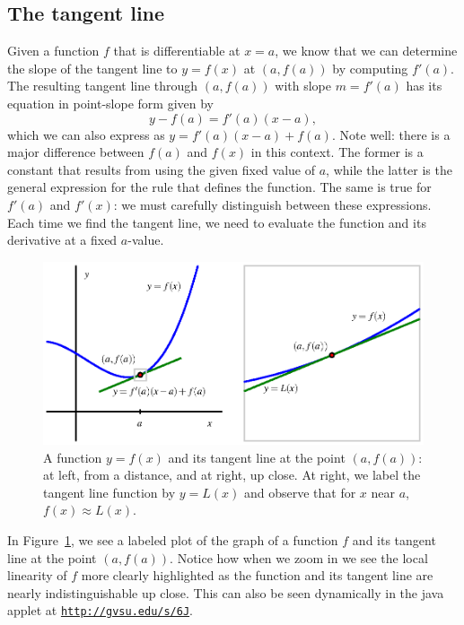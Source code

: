 \subsection*{The tangent line} 

Given a function $f$ that is differentiable at $x = a$, we know that we can determine the slope of the tangent line to $y = f(x)$ at $(a,f(a))$ by computing $f'(a)$.  The resulting tangent line through $(a,f(a))$ with slope $m = f'(a)$ has its equation in point-slope form given by
$$y - f(a) = f'(a)(x-a),$$
which we can also express as $y = f'(a)(x-a) + f(a)$.  Note well: there is a major difference between $f(a)$ and $f(x)$ in this context.  The former is a constant that results from using the given fixed value of $a$, while the latter is the general expression for the rule that defines the function.  The same is true for $f'(a)$ and $f'(x)$: we must carefully distinguish between these expressions.  Each time we find the tangent line, we need to evaluate the function and its derivative at a fixed $a$-value.

\begin{figure}[h]	
\begin{center}
\includegraphics{figures/1_8_TanLine.eps}
\caption{A function $y = f(x)$ and its tangent line at the point $(a,f(a))$: at left, from a distance, and at right, up close.  At right, we label the tangent line function by $y = L(x)$ and observe that for $x $ near $a$, $f(x) \approx L(x)$.} \label{F:1.8.TanLine}
\end{center}
\end{figure}

In Figure~\ref{F:1.8.TanLine}, we see a labeled plot of the graph of a function $f$ and its tangent line at the point $(a,f(a))$.  Notice how when we zoom in we see the local linearity of $f$ more clearly highlighted as the function and its tangent line are nearly indistinguishable up close.  This can also be seen dynamically in the java applet at \href{http://gvsu.edu/s/6J}{\texttt{http://gvsu.edu/s/6J}}.

